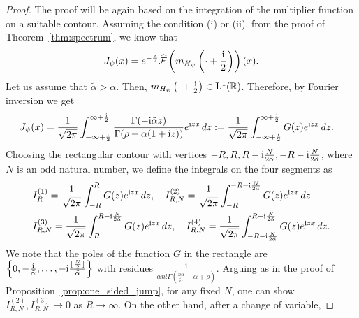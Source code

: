 \documentclass[12pt]{amsart}
\numberwithin{equation}{section}
\newcommand{\bb}{\mathbb}
\newcommand{\bmrm}[2][2]{\mathbf{#2}^{#1}}
\newcommand{\fou}{\mathcal{F}}
\newcommand{\Jpo}{J_{\psi}}
\newcommand{\Hpsi}{H_\psi}
\theoremstyle{definition}
\theoremstyle{assump}
\theoremstyle{remark}
\begin{document}
{\begin{proof}
The proof will be again based on the integration of the multiplier function on a suitable contour. Assuming the condition (i) or (ii), from the proof of Theorem~\ref{thm:spectrum}, we know that
\begin{align*}
\Jpo(x)=e^{-\frac{x}{2}}\widehat{\fou}\left(m_{\Hpsi}\left(\cdot+\frac{{\rm{i}}}{2}   \right)\right)(x). \nonumber
\end{align*}
Let us assume that $\tilde{\alpha}>\alpha$. Then, $m_{\Hpsi}\left(\cdot+\frac{{\rm{i}}}{2}   \right)\in\bmrm[1]{L}(\bb{R})$. Therefore, by Fourier inversion we get
\begin{align*}
\Jpo(x)&=\frac{1}{\sqrt{2\pi}}\int_{-\infty+\frac{{\rm{i}}}{2}   }^{\infty+\frac{{\rm{i}}}{2}   }\frac{\Gamma(-\mathrm{i}\tilde{\alpha} z)}{\Gamma(\rho+\alpha(1+{\rm{i}}z)   )}e^{{\rm{i}}zx}\,dz \nonumber
:=\frac{1}{\sqrt{2\pi}}\int_{-\infty+\frac{{\rm{i}}}{2}   }^{\infty+\frac{{\rm{i}}}{2}   } G(z)e^{{\rm{i}}zx}\,dz. \nonumber
\end{align*}
Choosing the rectangular contour with vertices $-R, R, R-{\rm{i}}\frac{N}{2\tilde{\alpha}}, -R-{\rm{i}}\frac{N}{2\tilde{\alpha}}$, where $N$ is an odd natural number, we define the integrals on the four segments as
\begin{equation} \nonumber
\begin{aligned}
&I^{(1)}_R=\frac{1}{\sqrt{2\pi}}\int_{-R}^R G(z)e^{{\rm{i}}zx}\,dz , \ \ \ I^{(2)}_{R,N}=\frac{1}{\sqrt{2\pi}}\int_{-R}^{-R-{\rm{i}}\frac{N}{2\tilde{\alpha}}} G(z)e^{{\rm{i}}zx}\,dz \\
&I^{(3)}_{R,N}=\frac{1}{\sqrt{2\pi}}\int_{R}^{R-{\rm{i}}\frac{N}{2\tilde{\alpha}}} G(z)e^{{\rm{i}}zx}\,dz, \ \ \ I^{(4)}_{R,N}=\frac{1}{\sqrt{2\pi}}\int_{-R-{\rm{i}}\frac{N}{2\tilde{\alpha}}}^{R-{\rm{i}}\frac{N}{2\tilde{\alpha}}} G(z)e^{{\rm{i}}zx}\,dz.
\end{aligned}
\end{equation}
We note that the poles of the function $G$ in the rectangle are $\left\{0,-\frac{\rm{i}}{\tilde{\alpha}},\ldots, -{\rm{i}}\frac{\lfloor\frac{N}{2}\rfloor}{\tilde{\alpha}}\right\}$ with residues $\frac{1}{\tilde{\alpha} n!\Gamma(\frac{n\alpha}{\tilde{\alpha}}+\alpha+\rho)}$.
Arguing as in the proof of Proposition~\ref{prop:one_sided_jump}, for any fixed $N$, one can show $I^{(2)}_{R,N}, I^{(3)}_{R,N}\to 0$ as $R\to\infty$. On the other hand, after a change of variable,

\end{proof}}
\end{document}

